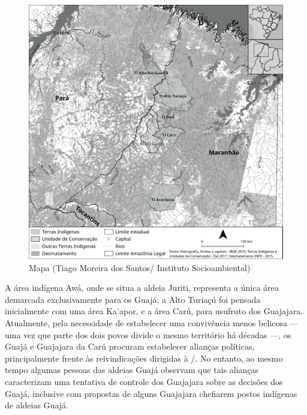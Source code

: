 \begin{figure}[H]
\centering
  \includegraphics[width=\textwidth]{./imgs/mapa_livro_uira}
\caption{Mapa (Tiago Moreira dos Santos/ Instituto Socioambiental)}
\end{figure}



A área indígena Awá, onde se situa a aldeia Juriti, representa a única
área demarcada exclusivamente para os Guajá; a  Alto Turiaçú foi
pensada inicialmente com uma área Ka'apor, e a área Carú, para usufruto
dos Guajajara. Atualmente, pela necessidade de estabelecer uma
convivência menos belicosa --- uma vez que parte dos dois povos divide o
mesmo território há décadas ---, os Guajá e Guajajara da  Carú procuram
estabelecer alianças políticas, principalmente frente às reivindicações
dirigidas à /. No entanto, ao mesmo tempo algumas pessoas das
aldeias Guajá observam que tais alianças caracterizam uma tentativa de
controle dos Guajajara sobre as decisões dos Guajá, inclusive com
propostas de alguns Guajajara chefiarem postos indígenas de aldeias
Guajá.

